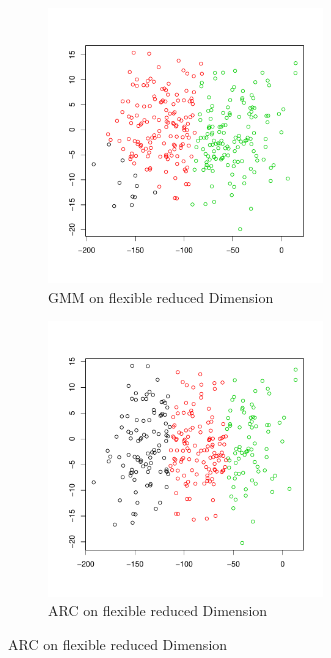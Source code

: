 \documentclass[12pt]{article}
\begin{document}
\begin{figure}[H]
 \begin{subfigure}[b]{0.49\textwidth}
 \includegraphics[width=0.8\textwidth]{pics/ld_gmm.pdf}
  \caption{GMM on flexible reduced Dimension}
\end{subfigure}
  \hfill
   \begin{subfigure}[b]{0.49\textwidth}
 \includegraphics[width=0.8\textwidth]{pics/ld_arc.pdf}
  \caption{ARC on flexible reduced Dimension}
\end{subfigure}

 \end{figure}
\end{document}
